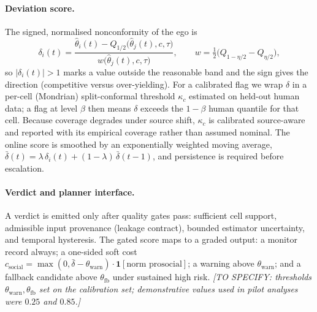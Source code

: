 \paragraph{Deviation score.}
The signed, normalised nonconformity of the ego is
\begin{equation}
\delta_i(t)=\frac{\hat\theta_i(t)-Q_{1/2}\!\bigl(\hat\theta_j(t),c,\tau\bigr)}
{w\!\bigl(\hat\theta_j(t),c,\tau\bigr)},
\qquad
w=\tfrac{1}{2}\bigl(Q_{1-\eta/2}-Q_{\eta/2}\bigr),
\end{equation}
so $|\delta_i(t)|>1$ marks a value outside the reasonable band and the sign gives the
direction (competitive versus over-yielding). For a calibrated flag we wrap $\delta$ in a
per-cell (Mondrian) split-conformal threshold $\kappa_c$ estimated on held-out human data; a
flag at level $\beta$ then means $\delta$ exceeds the $1-\beta$ human quantile for that cell.
Because coverage degrades under source shift, $\kappa_c$ is calibrated source-aware and
reported with its empirical coverage rather than assumed nominal. The online score is
smoothed by an exponentially weighted moving average,
$\bar\delta(t)=\lambda\,\delta_i(t)+(1-\lambda)\,\bar\delta(t-1)$, and persistence is required
before escalation.

\paragraph{Verdict and planner interface.}
A verdict is emitted only after quality gates pass: sufficient cell support, admissible input
provenance (leakage contract), bounded estimator uncertainty, and temporal hysteresis. The
gated score maps to a graded output: a monitor record always; a one-sided soft cost
$c_{\mathrm{social}}=\max(0,\bar\delta-\theta_{\mathrm{warn}})\cdot\mathbf{1}[\text{norm prosocial}]$;
a warning above $\theta_{\mathrm{warn}}$; and a fallback candidate above $\theta_{\mathrm{fb}}$
under sustained high risk.
\emph{[TO SPECIFY: thresholds $\theta_{\mathrm{warn}},\theta_{\mathrm{fb}}$ set on the
calibration set; demonstrative values used in pilot analyses were $0.25$ and $0.85$.]}

